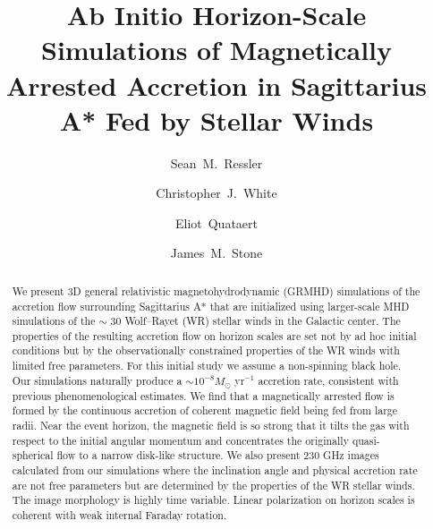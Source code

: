 \documentclass[twocolumn,twocolappendix,apjl,appendixfloats]{aastex63}
\begin{document}
  
\title{Ab Initio Horizon-Scale Simulations of Magnetically Arrested Accretion in Sagittarius A* Fed by Stellar Winds}
\author[0000-0003-0220-5723]{Sean~M.~Ressler}
\author{Christopher~J.~White}
\author[0000-0001-9185-5044]{Eliot~Quataert}
\author{James~M.~Stone}


\begin{abstract}
We present 3D general relativistic magnetohydrodynamic (GRMHD) simulations of the accretion flow surrounding Sagittarius A* that are initialized using larger-scale MHD simulations of the $\sim$ 30 Wolf--Rayet (WR) stellar winds in the Galactic center.
The properties of the resulting accretion flow on horizon scales are set not by ad hoc initial conditions but by the observationally constrained properties of the WR winds with limited free parameters. 
For this initial study we assume a non-spinning black hole.
Our simulations naturally produce a $\sim 10^{-8} M_\odot$ yr$^{-1}$ accretion rate, consistent with previous phenomenological estimates.  
We find that a magnetically arrested flow is formed by the continuous accretion of coherent magnetic field being fed from large radii.  
Near the event horizon, the magnetic field is so strong that it tilts the gas with respect to the initial angular momentum and concentrates the originally quasi-spherical flow to a narrow disk-like structure.
We also present 230 GHz images calculated from our simulations where the inclination angle and physical accretion rate are not free parameters but are determined by the properties of the WR stellar winds. 
The image morphology is highly time variable.  
Linear polarization on horizon scales is coherent with weak internal Faraday rotation.



\end{abstract}

\end{document}
